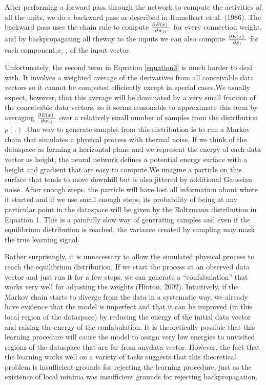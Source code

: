 \par{After performing a forward pass through the network to compute the activities of all the units, we do a backward pass as described in Rumelhart et al. (1986). The backward pass uses the chain rule to compute $\frac{{\partial E(x){\kern 1pt} {\kern 1pt} {\kern 1pt} }}{{\partial {w_{ij}}}}$ for every connection weight, and by backpropagating all theway to the inputs we can also compute $\frac{{\partial E(x){\kern 1pt} {\kern 1pt} {\kern 1pt} }}{{\partial {x_i}}}$  for each component,${x_i}$  , of the input vector.
}
\par{Unfortunately, the second term in Equation \ref{equation3} is much harder to deal with. It involves a weighted average of the derivatives from all conceivable data vectors so it cannot be computed efficiently except in special cases.We usually expect, however, that this average will be dominated by a very small fraction of the conceivable data vectors, so it seems reasonable to approximate this term by averaging  $\frac{{\partial E(x){\kern 1pt} {\kern 1pt} {\kern 1pt} }}{{\partial {w_{ij}}}}$ over a relatively small number of samples from the distribution $p\left( . \right)$ .One way to generate samples from this distribution is to run a Markov chain that simulates a physical process with thermal noise. If we think of the dataspace as forming a horizontal plane and we represent the energy of each data vector as height, the neural network defines a potential energy surface with a height and gradient that are easy to compute.We imagine a particle on this surface that tends to move downhill but is also jittered by additional Gaussian noise. After enough steps, the particle will have lost all information about where it started and if we use small enough steps, its probability of being at any particular point in the dataspace will be given by the Boltzmann distribution in Equation 1. This is a painfully slow way of generating samples and even if the equilibrium distribution is reached, the variance created by sampling may mask the true learning signal.
}
\par{Rather surprisingly, it is unnecessary to allow the simulated physical process to reach the equilibrium distribution. If we start the process at an observed data vector and just run it for a few steps, we can generate a “confabulation” that works very well for adjusting the weights (Hinton, 2002). Intuitively, if the Markov chain starts to diverge from the data in a systematic way, we already have evidence that the model is imperfect and that it can be improved (in this local region of the dataspace) by reducing the energy of the initial data vector and raising the energy of the confabulation. It is theoretically possible that this learning procedure will cause the model to assign very low energies to unvisited regions of the dataspace that are far from anydata vector. However, the fact that the learning works well on a variety of tasks suggests that this theoretical problem is insufficient grounds for rejecting the learning procedure, just as the existence of local minima was insufficient grounds for rejecting backpropagation.
}
